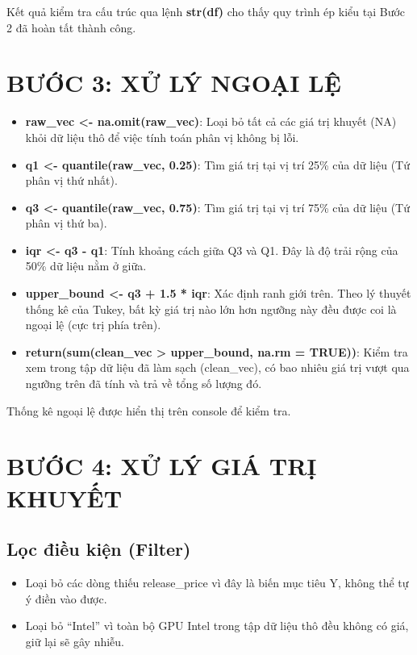\documentclass[12pt,a4paper]{article}
\begin{document}
Kết quả kiểm tra cấu trúc qua lệnh \textbf{str(df)} cho thấy quy trình ép kiểu tại Bước 2 đã hoàn tất thành công.

\section{BƯỚC 3: XỬ LÝ NGOẠI LỆ}

\begin{itemize}
    \item \textbf{raw\_vec <- na.omit(raw\_vec)}: Loại bỏ tất cả các giá trị khuyết (NA) khỏi dữ liệu thô để việc tính toán phân vị không bị lỗi.
    
    \item \textbf{q1 <- quantile(raw\_vec, 0.25)}: Tìm giá trị tại vị trí 25\% của dữ liệu (Tứ phân vị thứ nhất).
    
    \item \textbf{q3 <- quantile(raw\_vec, 0.75)}: Tìm giá trị tại vị trí 75\% của dữ liệu (Tứ phân vị thứ ba).
    
    \item \textbf{iqr <- q3 - q1}: Tính khoảng cách giữa Q3 và Q1. Đây là độ trải rộng của 50\% dữ liệu nằm ở giữa.
    
    \item \textbf{upper\_bound <- q3 + 1.5 * iqr}: Xác định ranh giới trên. Theo lý thuyết thống kê của Tukey, bất kỳ giá trị nào lớn hơn ngưỡng này đều được coi là ngoại lệ (cực trị phía trên).
    
    \item \textbf{return(sum(clean\_vec > upper\_bound, na.rm = TRUE))}: Kiểm tra xem trong tập dữ liệu đã làm sạch (clean\_vec), có bao nhiêu giá trị vượt qua ngưỡng trên đã tính và trả về tổng số lượng đó.
\end{itemize}

Thống kê ngoại lệ được hiển thị trên console để kiểm tra.

\section{BƯỚC 4: XỬ LÝ GIÁ TRỊ KHUYẾT}

\subsection{Lọc điều kiện (Filter)}

\begin{itemize}
    \item Loại bỏ các dòng thiếu release\_price vì đây là biến mục tiêu Y, không thể tự ý điền vào được.
    
    \item Loại bỏ ``Intel'' vì toàn bộ GPU Intel trong tập dữ liệu thô đều không có giá, giữ lại sẽ gây nhiễu.
\end{itemize}
\end{document}
